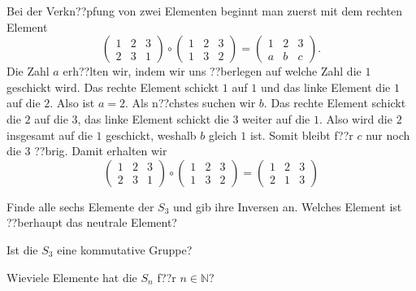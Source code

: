 \documentclass[a4paper,ngerman,12pt]{zirkelblatt1415}
\theoremstyle{definition}
\theoremstyle{plain}
\theoremstyle{remark}
\renewcommand{\NN}{\mathbb{N}}
\begin{document}
Bei der Verkn??pfung von zwei Elementen beginnt man zuerst mit dem rechten Element
\begin{equation*}
  \begin{pmatrix}
1 & 2 & 3 \\
2 & 3 & 1
  \end{pmatrix}
  \circ
  \begin{pmatrix}
1 & 2 & 3 \\
1 & 3 & 2
  \end{pmatrix}
  =
  \begin{pmatrix}
1 & 2 & 3 \\
a & b & c
  \end{pmatrix}.
\end{equation*}
Die Zahl $a$ erh??lten wir, indem wir uns ??berlegen auf welche Zahl die $1$ geschickt wird. Das rechte Element schickt $1$ auf $1$ und das linke Element die $1$ auf die $2$. Also ist $a=2$. Als n??chstes suchen wir $b$. Das rechte Element schickt die $2$ auf die $3$, das linke Element schickt die $3$ weiter auf die $1$. Also wird die $2$ insgesamt auf die $1$ geschickt, weshalb $b$ gleich $1$ ist. Somit bleibt f??r $c$ nur noch die $3$ ??brig. Damit erhalten wir
\begin{equation*}
  \begin{pmatrix}
1 & 2 & 3 \\
2 & 3 & 1
  \end{pmatrix}
  \circ
  \begin{pmatrix}
1 & 2 & 3 \\
1 & 3 & 2
  \end{pmatrix}
  =
  \begin{pmatrix}
1 & 2 & 3 \\
2 & 1 & 3
  \end{pmatrix}
\end{equation*}

\begin{aufgabe}{}
Finde alle sechs Elemente der $S_3$ und gib ihre Inversen an. Welches Element ist ??berhaupt das neutrale Element?
\end{aufgabe}

\begin{aufgabe}{}
Ist die $S_3$ eine kommutative Gruppe?
\end{aufgabe}

\begin{aufgabe}{}
Wieviele Elemente hat die $S_n$ f??r $n\in\NN$?
\end{aufgabe}
\end{document}
